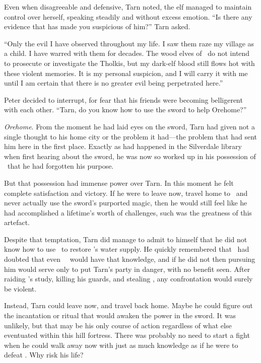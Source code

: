 Even when disagreeable and defensive, Tarn noted, the elf managed to maintain control over herself, speaking steadily and without excess emotion. ``Is there any evidence that has made you suspicious of him?''  Tarn asked.

``Only the evil I have observed throughout my life.  I saw them raze my village as a child.  I have warred with them for decades.  The wood elves of \inarthonor\ do not intend to prosecute or investigate the Tholkis, but my dark-elf blood still flows hot with these violent memories.  It is my personal suspicion, and I will carry it with me until I am certain that there is no greater evil being perpetrated here.''

Peter decided to interrupt, for fear that his friends were becoming belligerent with each other.  ``Tarn, do you know how to use the sword to help Orehome?''

\emph{Orehome}.  From the moment he had laid eyes on the sword, Tarn had given not a single thought to his home city or the problem it had---the problem that had sent him here in the first place.  Exactly as had happened in the Silverdale library when first hearing about the sword, he was now so worked up in his possession of \kildir\ that he had forgotten his purpose.

But that possession had immense power over Tarn.  In this moment he felt complete satisfaction and victory.  If he were to leave now, travel home to \korbarthrond\ and never actually use the sword's purported magic, then he would still feel like he had accomplished a lifetime's worth of challenges, such was the greatness of this artefact.

Despite that temptation, Tarn did manage to admit to himself that he did not know how to use \kildir\ to restore \korbarthrond's water supply.  He quickly remembered that \arilor\ had doubted that even \mothzam\ \driktur\ would have that knowledge, and if he did not then pursuing him would serve only to put Tarn's party in danger, with no benefit seen.  After raiding \mothzam's study, killing his guards, and stealing \kildir, any confrontation would surely be violent.

Instead, Tarn could leave now, and travel back home.  Maybe he could figure out the incantation or ritual that would awaken the power in the sword.  It was unlikely, but that may be his only course of action regardless of what else eventuated within this hill fortress.  There was probably no need to start a fight when he could walk away now with just as much knowledge as if he were to defeat \mothzam.  Why risk his life?

